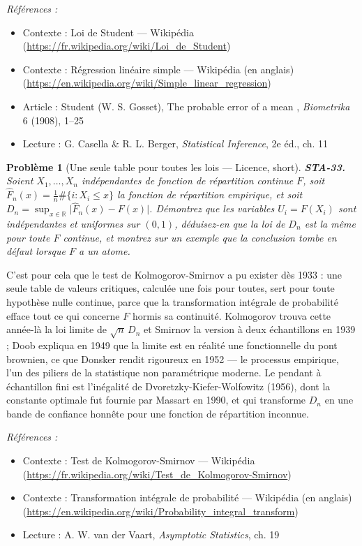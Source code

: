 \documentclass[11pt]{article}
\newtheorem{problem}{Problème}
\newenvironment{refs}{\par\small\noindent\emph{Références :}\begin{itemize}\setlength\itemsep{0pt}}{\end{itemize}\normalsize}
\begin{document}
\begin{refs}
\item Contexte : Loi de Student --- Wikipédia (\url{https://fr.wikipedia.org/wiki/Loi_de_Student})
\item Contexte : Régression linéaire simple --- Wikipédia (en anglais) (\url{https://en.wikipedia.org/wiki/Simple_linear_regression})
\item Article : Student (W. S. Gosset), \og{} The probable error of a mean \fg{}, \textit{Biometrika} 6 (1908), 1--25
\item Lecture : G. Casella \& R. L. Berger, \textit{Statistical Inference}, 2e éd., ch. 11
\end{refs}

\bigskip

\begin{problem}[{Une seule table pour toutes les lois --- Licence, short}]
\textbf{STA-33.} Soient $ X_1, \dots, X_n $ indépendantes de fonction de
répartition continue $ F $, soit $ \hat{F}_n(x) = \frac{1}{n}\#\{ i : X_i \le x \} $ la
fonction de répartition empirique, et soit
$ D_n = \sup_{x \in \mathbb{R}} \big| \hat{F}_n(x) - F(x) \big| $. Démontrez que les variables
$ U_i = F(X_i) $ sont indépendantes et uniformes sur $ (0,1) $, déduisez-en que la loi de
$ D_n $ est la même pour toute $ F $ continue, et montrez sur un exemple que la conclusion tombe
en défaut lorsque $ F $ a un atome.
\end{problem}

\noindent C'est pour cela que le test de Kolmogorov-Smirnov a pu exister dès 1933 : une
seule table de valeurs critiques, calculée une fois pour toutes, sert pour toute hypothèse nulle
continue, parce que la transformation intégrale de probabilité efface tout ce qui concerne $ F $
hormis sa continuité. Kolmogorov trouva cette année-là la loi limite de $ \sqrt{n}\,D_n $ et
Smirnov la version à deux échantillons en 1939 ; Doob expliqua en 1949 que la limite est en réalité
une fonctionnelle du pont brownien, ce que Donsker rendit rigoureux en 1952 --- le processus
empirique, l'un des piliers de la statistique non paramétrique moderne. Le pendant à échantillon
fini est l'inégalité de Dvoretzky-Kiefer-Wolfowitz (1956), dont la constante optimale fut fournie
par Massart en 1990, et qui transforme $ D_n $ en une bande de confiance honnête pour une
fonction de répartition inconnue.

\begin{refs}
\item Contexte : Test de Kolmogorov-Smirnov --- Wikipédia (\url{https://fr.wikipedia.org/wiki/Test_de_Kolmogorov-Smirnov})
\item Contexte : Transformation intégrale de probabilité --- Wikipédia (en anglais) (\url{https://en.wikipedia.org/wiki/Probability_integral_transform})
\item Lecture : A. W. van der Vaart, \textit{Asymptotic Statistics}, ch. 19
\end{refs}
\end{document}
